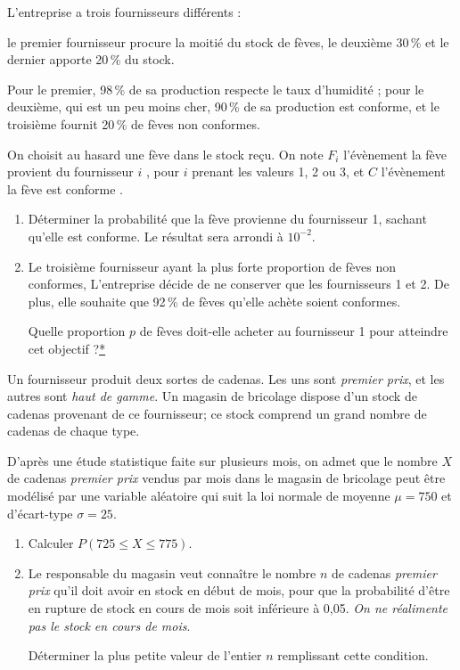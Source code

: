 \documentclass[12pt,french]{article}
\begin{document}
\begin{question}[subtitle={Amérique du Nord 2015}]
L'entreprise a trois fournisseurs différents : 

le premier fournisseur procure la moitié du stock de fèves, le deuxième
30\,\% et le dernier apporte 20\,\% du stock. 

Pour le premier, 98\,\% de sa production respecte le taux d'humidité ; pour
le deuxième, qui est un peu moins cher, 90\,\% de sa production est
conforme, et le troisième fournit 20\,\% de fèves non conformes. 

On choisit au hasard une fève dans le stock reçu. On note $F_i$ l'évènement
\og la fève provient du fournisseur $i$ \fg, pour $i$ prenant les valeurs 1,
2 ou 3, et $C$ l'évènement \og la fève est conforme \fg. 

\medskip

\begin{enumerate}
  \item Déterminer la probabilité que la fève provienne du fournisseur 1,
    sachant qu'elle est conforme. Le résultat sera arrondi à $10^{-2}$. 
  \item Le troisième fournisseur ayant la plus forte proportion de fèves non
    conformes, L’entreprise décide de ne conserver que les fournisseurs 1 et
    2. De plus, elle souhaite que 92\,\% de fèves qu'elle achète soient
    conformes. 

    Quelle proportion $p$ de fèves doit-elle acheter au fournisseur 1 pour
    atteindre cet objectif ?\hyperlink{Index}{*} 
\end{enumerate}

\end{question}

\begin{question}[subtitle={Centres étrangers 2015}]
Un fournisseur produit deux sortes de cadenas. Les uns sont \emph{premier
prix}, et les autres sont \emph{haut de gamme}. Un magasin de bricolage
dispose d'un stock de cadenas provenant de ce fournisseur; ce
stock comprend un grand nombre de cadenas de chaque type.

D'après une étude statistique faite sur plusieurs mois, on admet que le
nombre $X$ de cadenas
\emph{premier prix} vendus par mois dans le magasin de bricolage peut être
modélisé par une variable aléatoire qui suit la loi normale de moyenne $\mu
= 750$ et d'écart-type $\sigma = 25$.

\medskip

\begin{enumerate}
  \item Calculer $P(725 \leqslant  X \leqslant 775)$.
  \item Le responsable du magasin veut connaître le nombre $n$ de cadenas
    \emph{premier prix} qu'il doit avoir en stock en début de mois, pour que
    la probabilité d'être en rupture de stock en cours de mois soit
    inférieure à 0,05. \emph{On ne réalimente pas le stock en cours de
    mois}.

    \medskip

    Déterminer la plus petite valeur de l'entier $n$ remplissant cette
    condition.
\end{enumerate}

\end{question}
\end{document}

